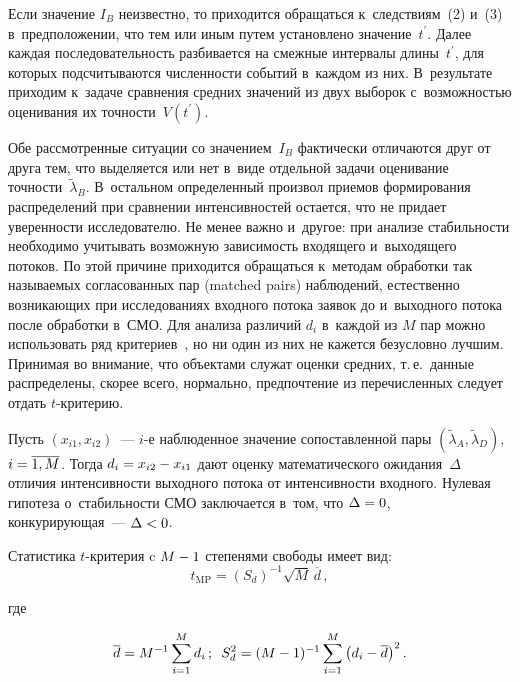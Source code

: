 \begin{multicols}{2}
     Если значение $I_B$ неизвестно, то приходится обращаться к~следствиям~(2) 
и~(3) в~предположении, что тем или иным путем установлено значение~$t^\prime$. 
Далее каж\-дая по\-сле\-до\-ва\-тель\-ность разбивается на смеж\-ные интервалы 
длины~$t^\prime$, для которых подсчитываются численности событий в~каждом 
из них. В~результате приходим к~задаче сравнения средних значений из двух 
выборок с~воз\-мож\-ностью оценивания их точ\-ности~$V(t^\prime)$. 
     
     Обе рассмотренные ситуации со значением~$I_B$ фактически отличаются 
друг от друга тем, что выделяется или нет в~виде отдельной задачи оценивание  
точ\-ности~$\tilde{\lambda}_B$. В~остальном определенный произвол приемов 
формирования распределений при сравнении интенсивностей остается, что не 
придает уве\-рен\-ности исследователю. Не менее важно и~другое: при анализе 
ста\-биль\-ности необходимо учитывать возможную за\-ви\-си\-мость входящего 
и~выходящего потоков. По этой причине приходится обращаться к~методам 
обработки так на\-зы\-ва\-емых согласованных пар (matched pairs) наблюдений, 
естественно воз\-ни\-ка\-ющих при исследованиях входного потока заявок до 
и~выходного потока после обработки в~СМО. Для анализа различий $d_i$  в~каждой 
из $M$ пар мож\-но использовать ряд  
критериев~\cite[с.~4579--4583, 7726--7730, 9150--9153]{8-kri}, но ни один из них 
не кажется безуслов\-но лучшим. Принимая во внимание, что объектами служат 
оценки средних, т.\,е.\ данные распределены, скорее всего, нормально, 
предпочтение из пе\-ре\-чис\-лен\-ных следует отдать $t$-кри\-те\-рию. 
     
     Пусть $(x_{i1}, x_{i2})$~--- $i$-е наблюденное значение сопоставленной 
пары $(\tilde{\lambda}_A, \tilde{\lambda}_D)$, $i\hm= \overline{1, M}$. Тогда $d_i\hm= 
x_{i2}\hm- x_{i1}$ дают оценку математического ожидания~$\Delta$ отличия 
интенсивности выходного потока от интенсивности входного. Нулевая гипотеза 
о~ста\-биль\-ности СМО заключается в~том, что $\Delta\hm=0$, кон\-ку\-ри\-ру\-ющая~--- 
$\Delta\hm <0$.
     
     Статистика $t$-кри\-те\-рия c $M\hm-1$ степенями свободы имеет вид:
     $$
     t_{\mathrm{MP}} =\left( S_d\right)^{-1}\sqrt{M}\,\overline{d}\,,
     $$
     
     \vspace*{-2pt}
     
     \noindent
     где 
     
     \noindent
     $$
     \overline{d}= M^{-1}\sum\limits_{i=1}^M d_i\,;\enskip S_d^2= (M-1)^{-1} 
\sum\limits^M_{i=1} \left( d_i-\overline{d}\right)^2.
     $$ 
     \vspace*{-2pt}
     

\end{multicols}
